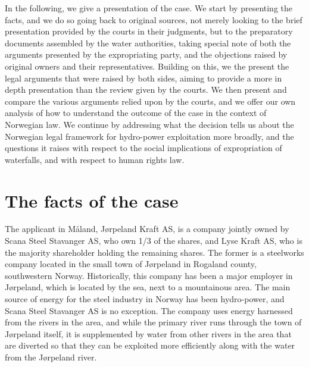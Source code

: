 In the following, we give a presentation of the case. We start by presenting the facts, and we do so going back to original sources, not merely looking to the brief presentation provided by the courts in their judgments, but to the preparatory documents assembled by the water authorities, taking special note of both the arguments presented by the expropriating party, and the objections raised by original owners and their representatives. Building on this, we the present the legal arguments that were raised by both sides, aiming to provide a more in depth presentation than the review given by the courts. We then present and compare the various arguments relied upon by the courts, and we offer our own analysis of how to understand the outcome of the case in the context of Norwegian law. We continue by addressing what the decision tells us about the Norwegian legal framework for hydro-power exploitation more broadly, and the questions it raises with respect to the social implications of expropriation of waterfalls, and with respect to human rights law.

\section{The facts of the case}\label{sum}


The applicant in Måland, Jørpeland Kraft AS, is a company jointly owned by Scana Steel Stavanger AS, who own 1/3 of the shares, and Lyse Kraft AS, who is the majority shareholder holding the remaining shares. The former is a steelworks company located in the small town of Jørpeland in Rogaland county, southwestern Norway. Historically, this company has been a major employer in Jørpeland, which is located by the sea, next to a mountainous area. The main source of energy for the steel industry in Norway has been hydro-power, and Scana Steel Stavanger AS is no exception. The company uses energy harnessed from the rivers in the area, and while the primary river runs through the town of Jørpeland itself, it is supplemented by water from other rivers in the area that are diverted so that they can be exploited more efficiently along with the water from the Jørpeland river.

